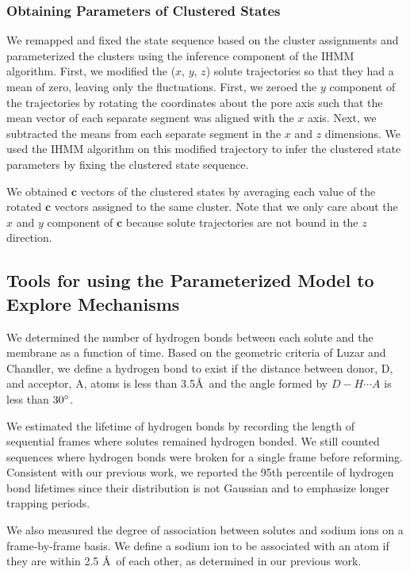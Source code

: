 \documentclass[journal=jpcbfk,manuscript=article]{achemso}
\begin{document}
  \subsubsection*{Obtaining Parameters of Clustered States}
  
  We remapped and fixed the state sequence based on the cluster assignments and
  parameterized the clusters using the inference component of the IHMM algorithm. 
  First, we modified the ($x$, $y$, $z$) solute trajectories so that they had a 
  mean of zero, leaving only the fluctuations. First, we zeroed the $y$ component
  of the trajectories by rotating the coordinates about the pore axis such that 
  the mean vector of each separate segment was aligned with the $x$ axis. Next, 
  we subtracted the means from each separate segment in the $x$ and $z$ dimensions.
  We used the IHMM algorithm on this modified trajectory to infer the clustered 
  state parameters by fixing the clustered state sequence. 
  
  We obtained $\mathbf{c}$ vectors of the clustered states by averaging 
  each value of the rotated $\mathbf{c}$ vectors assigned to the same cluster. Note
  that we only care about the $x$ and $y$ component of $\mathbf{c}$ because solute 
  trajectories are not bound in the $z$ direction.

  \subsection{Tools for using the Parameterized Model to Explore Mechanisms}\label{method:interactions}
  
  We determined the number of hydrogen bonds between each solute and the membrane
  as a function of time. Based on the geometric criteria of Luzar and Chandler, we 
  define a hydrogen bond to exist if the distance between donor, D, and acceptor, 
  A, atoms is less than 3.5\AA~and the angle formed by $D-H \cdots A$ is less than 
  $30\degree$.~\cite{luzar_effect_1996}
  
  We estimated the lifetime of hydrogen bonds by recording the length of 
  sequential frames where solutes remained hydrogen bonded. We still counted sequences
  where hydrogen bonds were broken for a single frame before reforming. Consistent
  with our previous work, we reported the 95th percentile of hydrogen bond lifetimes
  since their distribution is not Gaussian and to emphasize longer trapping periods.~\cite{coscia_chemically_2019}
  
  We also measured the degree of association between solutes and sodium ions on a
  frame-by-frame basis. We define a sodium ion to be associated with an atom if they
  are within 2.5 \AA~of each other, as determined in our previous work.~\cite{coscia_chemically_2019}
  
\end{document}
